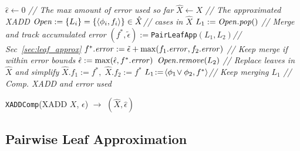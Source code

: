\incmargin{1.5em}
\linesnumbered
\begin{algorithm}[t!]
\dontprintsemicolon
$\hat{\epsilon} \gets 0$ \emph{// The max amount of error used so far}\;
$\hat{X} \gets X$ \emph{// The approximated XADD}\;
$\mathit{Open} := \{ L_i \} = \{ \langle \phi_i, f_i \rangle \} \in \hat{X}$\emph{// cases in $\hat{X}$}\;
\While{$\Open \neq \emptyset$} {
	$L_1 := \mathit{Open}.\mathit{pop}()$\;
	  { 
                \emph{// Merge and track accumulated error}\;
		$(f^*,\tilde{\epsilon}) :=$\texttt{PairLeafApp}$(L_1, L_2)$\emph{// Sec~\ref{sec:leaf_approx}}\;
	        $f^*.\mathit{error} := \tilde{\epsilon} + \max(f_1.\mathit{error},f_2.\mathit{error})$\;
                \emph{// Keep merge if within error bounds}\;
		{       
                        $\hat{\epsilon} := \max(\hat{\epsilon}, f^*.\mathit{error})$\;
			$\mathit{Open}.\mathit{remove}(L_2)$\;
                        \emph{// Replace leaves in $\hat{X}$ and simplify}\;
			$\hat{X}.f_1 := f^*, \; \hat{X}.f_2 := f^*$\; 
                        $L_1 \! := \! \langle \phi_1 \! \lor \phi_2, f^* \rangle$\emph{// Keep merging $L_1$}\;
			\; 
		}
	}
}
\emph{// Comp. XADD and error used}\;
\caption{\footnotesize 
 \texttt{XADDComp}(XADD $X$, $\epsilon$) $\longrightarrow$ $(\hat{X},\hat{\epsilon})$}
\label{alg:approx}
\end{algorithm}
\decmargin{1.5em}

\subsection{Pairwise Leaf Approximation}

